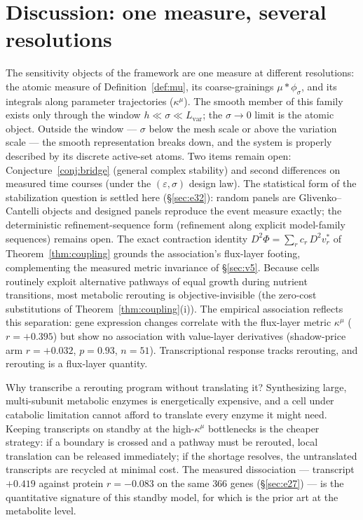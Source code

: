 \documentclass[11pt,a4paper]{article}
\theoremstyle{plain}
\theoremstyle{definition}
\theoremstyle{remark}
\newcommand{\kmu}{\kappa^{\mu}}
\begin{document}
\section{Discussion: one measure, several resolutions}
\label{sec:discussion}

The sensitivity objects of the framework are one measure at different
resolutions: the atomic measure of Definition~\ref{def:mu}, its
coarse-grainings $\mu * \phi_\sigma$, and its integrals along parameter
trajectories ($\kmu$). The smooth member of this family exists only
through the window $h \ll \sigma \ll L_{\mathrm{var}}$; the
$\sigma \to 0$ limit is the atomic object. Outside the window ---
$\sigma$ below the mesh scale or above the variation scale --- the
smooth representation breaks down, and the system is properly
described by its discrete active-set atoms. Two items remain open:
Conjecture~\ref{conj:bridge} (general complex stability) and second
differences on measured time courses (under the $(\varepsilon,
\sigma)$ design law). The statistical form of the stabilization
question is settled here (\S\ref{sec:e32}): random panels are
Glivenko--Cantelli objects and designed panels reproduce the event
measure exactly; the deterministic refinement-sequence form
(refinement along explicit model-family sequences) remains open.
The exact contraction identity
$D^2\Phi = \sum_r c_r\, D^2 v^*_r$ of Theorem~\ref{thm:coupling}
grounds the association's flux-layer footing, complementing the
measured metric invariance of \S\ref{sec:v5}. Because cells routinely
exploit alternative pathways of equal growth during nutrient
transitions, most metabolic rerouting is objective-invisible (the
zero-cost substitutions of Theorem~\ref{thm:coupling}(i)). The
empirical association reflects this separation: gene expression
changes correlate with the flux-layer metric $\kmu$ ($r = +0.395$)
but show no association with value-layer derivatives (shadow-price
arm $r = +0.032$, $p = 0.93$, $n = 51$). Transcriptional response
tracks rerouting, and rerouting is a flux-layer quantity.

Why transcribe a rerouting program without translating it? Synthesizing
large, multi-subunit metabolic enzymes is energetically expensive, and
a cell under catabolic limitation cannot afford to translate every
enzyme it might need. Keeping transcripts on standby at the
high-$\kmu$ bottlenecks is the cheaper strategy: if a boundary is
crossed and a pathway must be rerouted, local translation can be
released immediately; if the shortage resolves, the untranslated
transcripts are recycled at minimal cost. The measured dissociation
--- transcript $+0.419$ against protein $r = -0.083$ on the same
$366$ genes (\S\ref{sec:e27}) --- is the quantitative signature of
this standby model, for which \citet{kochanowski2013} is the prior
art at the metabolite level.
\end{document}
